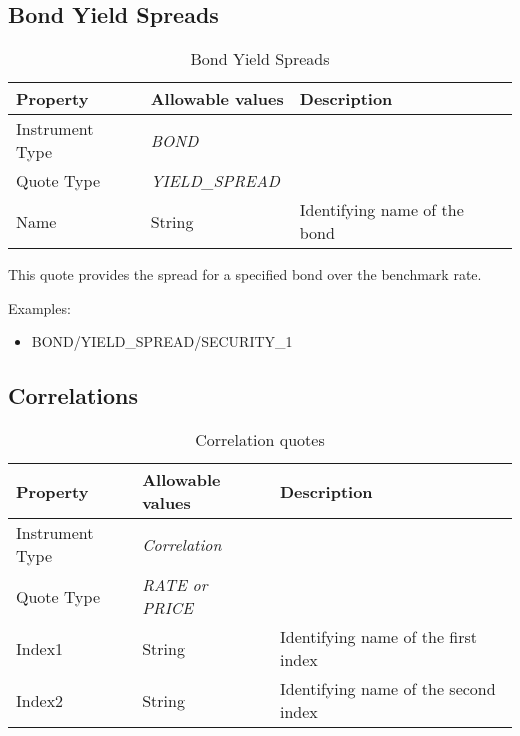 \subsection{Bond Yield Spreads}

\begin{table}[H]
\centering
  \begin{tabular}{|p{3cm}|p{3.5cm}|p{7cm}|}
  \hline
  {\bf Property} & {\bf Allowable values} & {\bf Description} \\ \hline
    Instrument Type & \emph{BOND} & \\ \hline
    Quote Type & \emph{YIELD\_SPREAD} & \\ \hline
    Name & String & Identifying name of the bond \\ \hline
  \end{tabular}
  \caption{Bond Yield Spreads}
  \label{tab:bondyieldspread_quote}
\end{table}

This quote provides the spread for a specified bond over the benchmark rate.

\medskip
Examples:
\begin{itemize}
	\item BOND/YIELD\_SPREAD/SECURITY\_1
\end{itemize}

\subsection{Correlations}

\begin{table}[H]
\centering
  \begin{tabular}{|p{3cm}|p{3.5cm}|p{7cm}|}
  \hline
  {\bf Property} & {\bf Allowable values} & {\bf Description} \\ \hline
    Instrument Type & \emph{Correlation} & \\ \hline
    Quote Type & \emph{RATE or PRICE} & \\ \hline
    Index1 & String & Identifying name of the first index \\ \hline
    Index2 & String & Identifying name of the second index \\ \hline
  \end{tabular}
  \caption{Correlation quotes}
  \label{tab:correlation_quote}
\end{table}

